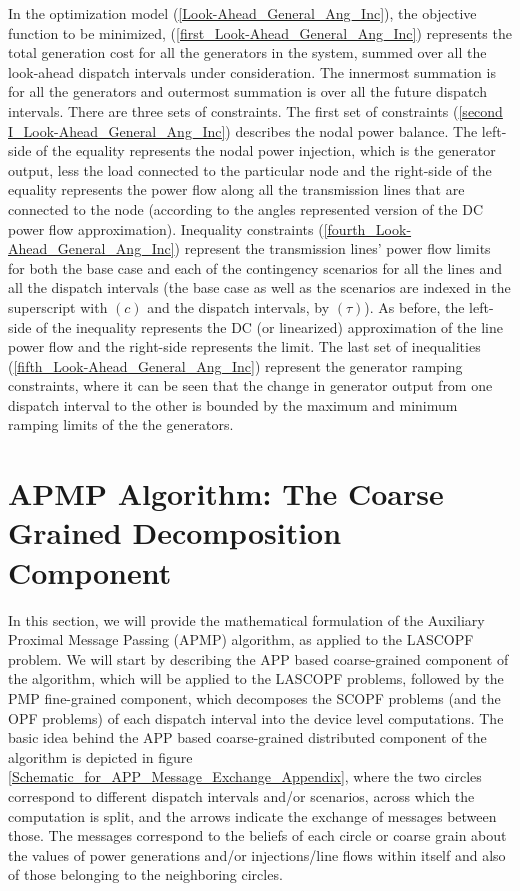 \documentclass[preprint,12pt,3p]{elsarticle}
\begin{document}
	In the optimization model (\ref{Look-Ahead_General_Ang_Inc}), the objective function to be minimized, (\ref{first_Look-Ahead_General_Ang_Inc}) represents the total generation cost for all the generators in the system, summed over all the look-ahead dispatch intervals under consideration. The innermost summation is for all the generators and outermost summation is over all the future dispatch intervals. There are three sets of constraints. The first set of constraints (\ref{second I_Look-Ahead_General_Ang_Inc}) describes the nodal power balance. The left-side of the equality represents the nodal power injection, which is the generator output, less the load connected to the particular node and the right-side of the equality represents the power flow along all the transmission lines that are connected to the node (according to the angles represented version of the DC power flow approximation). Inequality constraints (\ref{fourth_Look-Ahead_General_Ang_Inc}) represent the transmission lines' power flow limits for both the base case and each of the contingency scenarios for all the lines and all the dispatch intervals (the base case as well as the scenarios are indexed in the superscript with $(c)$ and the dispatch intervals, by $(\tau)$). As before, the left-side of the inequality represents the DC (or linearized) approximation of the line power flow and the right-side represents the limit. The last set of inequalities (\ref{fifth_Look-Ahead_General_Ang_Inc}) represent the generator ramping constraints, where it can be seen that the change in generator output from one dispatch interval to the other is bounded by the maximum and minimum ramping limits of the the generators.
	\section{APMP Algorithm: The Coarse Grained Decomposition Component}
	\label{APMPAlgo}
	In this section, we will provide the mathematical formulation of the Auxiliary Proximal Message Passing (APMP) algorithm, as applied to the LASCOPF problem. We will start by describing the APP based coarse-grained component of the algorithm, which will be applied to the LASCOPF problems, followed by the PMP fine-grained component, which decomposes the SCOPF problems (and the OPF problems) of each dispatch interval into the device level computations. The basic idea behind the APP based coarse-grained distributed component of the algorithm is depicted in figure \ref{Schematic_for_APP_Message_Exchange_Appendix}, where the two circles correspond to different dispatch intervals and/or scenarios, across which the computation is split, and the arrows indicate the exchange of messages between those. The messages correspond to the beliefs of each circle or coarse grain about the values of power generations and/or injections/line flows within itself and also of those belonging to the neighboring circles.
\end{document}
